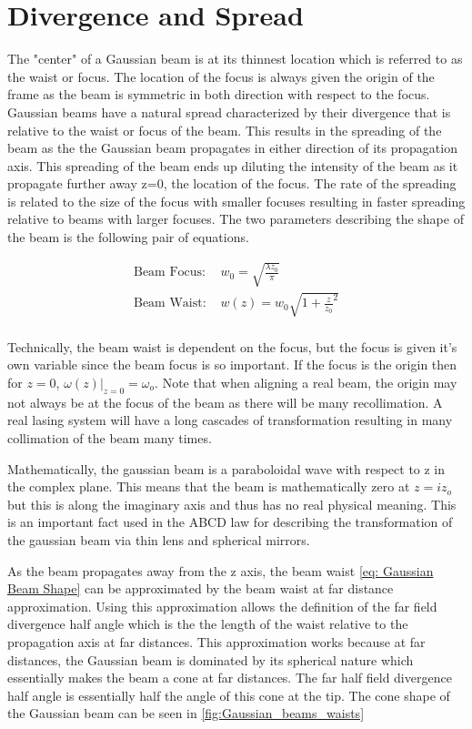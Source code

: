 \documentclass[11pt,a4paper]{book}
\begin{document}
	\section{Divergence and Spread}
		\label{sec:Divergence}
		The "center" of a Gaussian beam is at its thinnest location which is referred to as the waist or focus. The location of the focus is always given the origin of the frame as the beam is symmetric in both direction with respect to the focus. Gaussian beams have a natural spread characterized by their divergence that is relative to the waist or focus of the beam. This results in the spreading of the beam as the the Gaussian beam propagates in either direction of its propagation axis. This spreading of the beam ends up diluting the intensity of the beam as it propagate further away z=0, the location of the focus. The rate of the spreading is related to the size of the focus with smaller focuses resulting in faster spreading relative to beams with larger focuses. The two parameters describing the shape of the beam is the following pair of equations. 
		
		\begin{equation}
		\label{eq: Gaussian Beam Shape}
		\begin{split}
		\text{Beam Focus: }& w_0 = \sqrt{\frac{\lambda z_0}{\pi}}\\
		\text{Beam Waist: } & w(z) = w_0 \sqrt{1+\frac{z}{z_0}^2}\\
		\end{split}
		\end{equation}
		
		Technically, the beam waist is dependent on the focus, but the focus is given it's own variable since the beam focus is so important. If the focus is the origin then for $z=0$, $\omega(z)|_{z=0}=\omega_o$. Note that when aligning a real beam, the origin may not always be at the focus of the beam as there will be many recollimation. A real lasing system will have a long cascades of transformation resulting in many collimation of the beam many times.
		
		Mathematically, the gaussian beam is a paraboloidal wave with respect to z in the complex plane. This means that the beam is mathematically zero at $z=i z_o$ but this is along the imaginary axis and thus has no real physical meaning. This is an important fact used in the ABCD law for describing the transformation of the gaussian beam via thin lens and spherical mirrors.
		
		As the beam propagates away from the z axis, the beam waist \autoref{eq: Gaussian Beam Shape} can be approximated by the 
		beam waist at far distance approximation. Using this approximation allows the definition of the far field divergence half angle which is the the length of the waist  relative to the propagation axis at far distances. This approximation works because at far distances, the Gaussian beam is dominated by its spherical nature which essentially makes the beam a cone at far distances. The far half field divergence half angle is essentially half the angle of this cone at the tip. The cone shape of the Gaussian beam can be seen in \autoref{fig:Gaussian_beams_waists}
		
\end{document}
